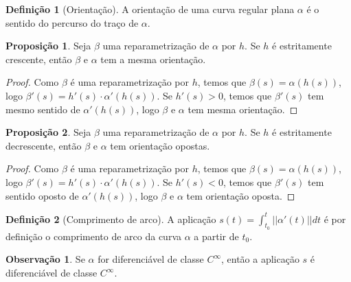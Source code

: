 \documentclass[12pt,leqno,twoside]{amsart}
\theoremstyle{definition}
\newtheorem{proposicao}{Proposição}[section]
\newtheorem{definicao}{Definição}[section]
\newtheorem*{obs}{Observação}
\begin{document}
\vspace{0.2cm}



\begin{definicao}[Orientação]
	A orientação de uma curva regular plana $\alpha$ é o sentido do percurso do traço de $\alpha$.
\end{definicao}

\vspace{0.2cm}


\begin{proposicao}
	Seja $\beta$ uma reparametrização de $\alpha$ por $h$. Se $h$ é estritamente crescente, então $\beta$ e $\alpha$ tem a mesma orientação.
\end{proposicao}
\begin{proof}
	Como $\beta$ é uma reparametrização por $h$, temos que $\beta(s) = \alpha(h(s))$, logo $\beta'(s) = h'(s) \cdot \alpha'( h(s))$. Se $h'(s) > 0 $, temos que $\beta'(s)$ tem mesmo sentido de $\alpha'(h(s))$, logo  $\beta$ e $\alpha$  tem mesma orientação.
\end{proof}


\vspace{0.2cm}


\begin{proposicao}
	Seja $\beta$ uma reparametrização de $\alpha$ por $h$. Se $h$ é estritamente decrescente, então $\beta$ e $\alpha$ tem orientação opostas.
\end{proposicao}
\begin{proof}
	Como $\beta$ é uma reparametrização por $h$, temos que $\beta(s) = \alpha(h(s))$, logo $\beta'(s) = h'(s) \cdot \alpha'( h(s))$. Se $h'(s) < 0 $, temos que $\beta'(s)$ tem  sentido oposto de $\alpha'(h(s))$, logo  $\beta$ e $\alpha$ tem orientação oposta.
\end{proof}

\vspace{0.2cm}

\begin{definicao}[Comprimento de arco]
	A aplicação $s(t) = \displaystyle\int_{t_0}^{t}||\alpha'(t)|| dt$ é por definição o  comprimento de arco da curva $\alpha$ a partir de $t_0$.
\end{definicao}

\vspace{0.2cm}

\begin{obs}
	Se $\alpha$ for diferenciável de classe $C^{\infty}$, então a aplicação $s$ é diferenciável de classe $C^{\infty}$.
\end{obs}
\end{document}
